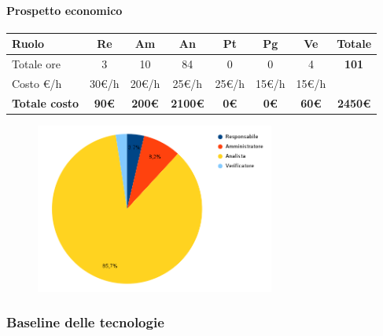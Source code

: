 \paragraph{Prospetto economico}
\begin{center}
	\renewcommand{\arraystretch}{1.8} %
	\begin{tabular}{ |m{10em}|c|c|c|c|c|c|c| }
	\hline
	\textbf{Ruolo} & \textbf{Re} & \textbf{Am} &  \textbf{An} &  \textbf{Pt} &  \textbf{Pg} &  \textbf{Ve} &  \textbf{Totale}\\
    \hline
    Totale ore & 3 & 10 & 84 & 0 & 0 & 4 & \textbf{101}\\
    \hline
    Costo \euro/h & 30\euro/h & 20\euro/h & 25\euro/h & 25\euro/h & 15\euro/h & 15\euro/h & \\
    \hline
    \textbf{Totale costo} & \textbf{90\euro} & \textbf{200\euro} &  \textbf{2100\euro} &  \textbf{0\euro} &  \textbf{0\euro} &  \textbf{60\euro} &  \textbf{2450\euro}\\
    \hline
	\end{tabular}

    \begin{figure}[H]
        \centering\includegraphics[width=0.7\textwidth, height=0.7\textheight, keepaspectratio]{images/preventivo/RTB-requisiti-costo.png}
    \end{figure}
    
\end{center}

\subsubsection{Baseline delle tecnologie}
